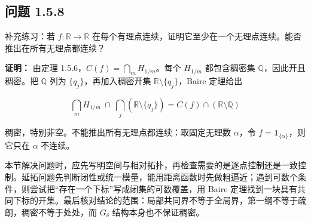 \documentclass[11pt,a4paper]{article}
\begin{document}
\subsection{问题 1.5.8}\label{ux95eeux9898-1.5.8}

补充练习：若 \(f:\mathbb R\to\mathbb R\)
在每个有理点连续，证明它至少在一个无理点连续。能否推出在所有无理点都连续？

\textbf{证明：} 由定理 1.5.6，\(C(f)=\bigcap_mH_{1/m}\)。每个
\(H_{1/m}\) 都包含稠密集 \(\mathbb Q\)，因此开且稠密。把 \(\mathbb Q\)
列为 \(\{q_j\}\)，再加入稠密开集 \(\mathbb R\setminus\{q_j\}\)，Baire
定理给出

\begin{equation*}
\bigcap_mH_{1/m}\ \cap\ \bigcap_j(\mathbb R\setminus\{q_j\})
=C(f)\cap(\mathbb R\setminus\mathbb Q)
\tag{1.5.23}
\end{equation*}

稠密，特别非空。不能推出所有无理点都连续：取固定无理数 \(\alpha\)，令
\(f=\mathbf1_{\{\alpha\}}\)，则它只在 \(\alpha\) 不连续。

本节解决问题时，应先写明空间与相对拓扑，再检查需要的是逐点控制还是一致控制。延拓问题先判断闭性或统一模量，能用距离函数时先做粗逼近；遇到可数个条件，则尝试把``存在一个下标''写成闭集的可数覆盖，用
Baire
定理找到一块具有共同下标的开集。最后核对结论的范围：局部共同界不等于全局界，第一纲不等于疏朗，稠密不等于处处，而
\(G_\delta\) 结构本身也不保证稠密。
\end{document}
